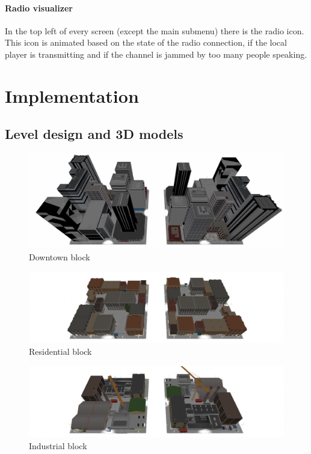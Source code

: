 \documentclass[12pt]{article}
\newcommand\blankpage{%
    \null
    \thispagestyle{empty}%
    \addtocounter{page}{-1}%
    \newpage}
\begin{document}
\paragraph{Radio visualizer}
In the top left of every screen (except the main submenu) there is the radio icon. This icon is animated based on the state of the radio connection, if the local player is transmitting and if the channel is jammed by too many people speaking.

\afterpage{\blankpage}

\clearpage

\section{Implementation}

\subsection{Level design and 3D models}
\begin{figure}[H]
\includegraphics[width=\textwidth]{blockskyscraper}
\caption{Downtown block}
\end{figure}
\begin{figure}[H]
\includegraphics[width=\textwidth]{blockresidential}
\caption{Residential block}
\end{figure}
\begin{figure}[H]
\includegraphics[width=\textwidth]{blockcargo}
\caption{Industrial block}
\end{figure}
\end{document}

